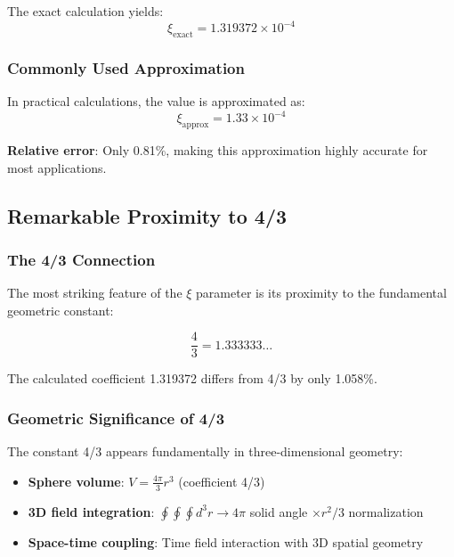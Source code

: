 \documentclass[12pt,a4paper]{article}
\newcommand{\xipar}{\ensuremath{\xi}}
\newcommand{\mypi}{\ensuremath{\pi}}
\newcommand{\mytimes}{\ensuremath{\times}}
\newcommand{\myrightarrow}{\ensuremath{\rightarrow}}
\begin{document}
	The exact calculation yields:
	\begin{equation}
		\xipar_{\text{exact}} = 1.319372 \mytimes 10^{-4}
		\label{eq:xi_exact}
	\end{equation}
	
	\subsubsection{Commonly Used Approximation}
	\label{subsubsec:approximation}
	
	In practical calculations, the value is approximated as:
	\begin{equation}
		\xipar_{\text{approx}} = 1.33 \mytimes 10^{-4}
		\label{eq:xi_approx}
	\end{equation}
	
	\textbf{Relative error}: Only 0.81\%, making this approximation highly accurate for most applications.
	
	\subsection{Remarkable Proximity to 4/3}
	\label{subsec:four_thirds_proximity}
	
	\subsubsection{The 4/3 Connection}
	\label{subsubsec:four_thirds_connection}
	
	The most striking feature of the $\xi$ parameter is its proximity to the fundamental geometric constant:
	
	\begin{equation}
		\frac{4}{3} = 1.333333\ldots
		\label{eq:four_thirds}
	\end{equation}
	
	The calculated coefficient 1.319372 differs from 4/3 by only 1.058\%.
	
	\subsubsection{Geometric Significance of 4/3}
	\label{subsubsec:geometric_significance}
	
	The constant 4/3 appears fundamentally in three-dimensional geometry:
	
	\begin{tcolorbox}[colback=green!5!white,colframe=green!75!black,title=Geometric Meaning of 4/3]
		\begin{itemize}
			\item \textbf{Sphere volume}: $V = \frac{4\mypi}{3}r^3$ (coefficient 4/3)
			\item \textbf{3D field integration}: $\oint\oint\oint d^3r \myrightarrow 4\mypi$ solid angle $\mytimes r^2/3$ normalization
			\item \textbf{Space-time coupling}: Time field interaction with 3D spatial geometry
		\end{itemize}
	\end{tcolorbox}
	
\end{document}
